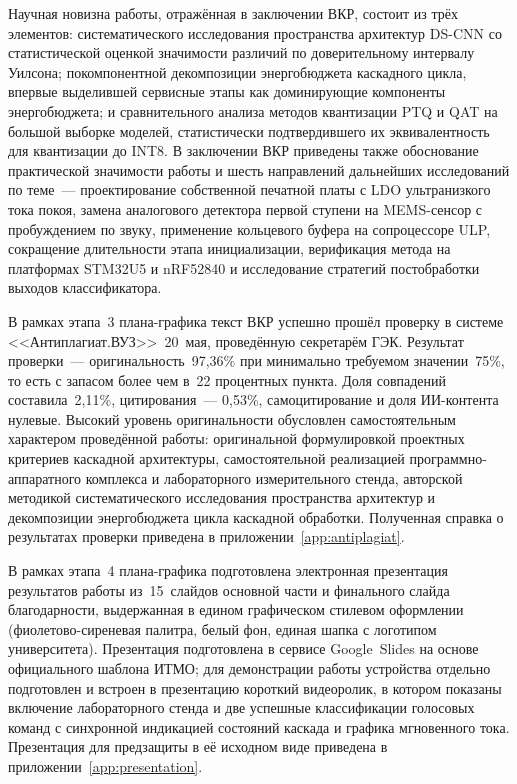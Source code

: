 Научная новизна работы, отражённая в заключении ВКР, состоит из
трёх элементов: систематического исследования пространства
архитектур DS-CNN со статистической оценкой значимости различий
по доверительному интервалу Уилсона; покомпонентной декомпозиции
энергобюджета каскадного цикла, впервые выделившей сервисные
этапы как доминирующие компоненты энергобюджета; и сравнительного
анализа методов квантизации PTQ и QAT на большой выборке моделей,
статистически подтвердившего их эквивалентность для квантизации
до INT8. В заключении ВКР приведены также обоснование практической
значимости работы и шесть направлений дальнейших исследований по
теме~--- проектирование собственной печатной платы с LDO
ультранизкого тока покоя, замена аналогового детектора первой
ступени на MEMS-сенсор с пробуждением по звуку, применение
кольцевого буфера на сопроцессоре ULP, сокращение длительности
этапа инициализации, верификация метода на платформах STM32U5 и
nRF52840 и исследование стратегий постобработки выходов
классификатора.

В рамках этапа~3 плана-графика текст ВКР успешно прошёл проверку
в системе <<Антиплагиат.ВУЗ>>~20~мая, проведённую секретарём ГЭК.
Результат проверки~--- оригинальность~97,36\% при минимально
требуемом значении~75\%, то есть с запасом более чем в~22
процентных пункта. Доля совпадений составила~2,11\%,
цитирования~--- 0,53\%, самоцитирование и доля ИИ-контента
нулевые. Высокий уровень оригинальности обусловлен
самостоятельным характером проведённой работы: оригинальной
формулировкой проектных критериев каскадной архитектуры,
самостоятельной реализацией программно-аппаратного комплекса и
лабораторного измерительного стенда, авторской методикой
систематического исследования пространства архитектур и
декомпозиции энергобюджета цикла каскадной обработки. Полученная
справка о результатах проверки приведена в
приложении~\ref{app:antiplagiat}.

В рамках этапа~4 плана-графика подготовлена электронная
презентация результатов работы из~15~слайдов основной части и
финального слайда благодарности, выдержанная в едином графическом
стилевом оформлении (фиолетово-сиреневая палитра, белый фон,
единая шапка с логотипом университета). Презентация подготовлена в
сервисе Google~Slides на основе официального шаблона ИТМО; для
демонстрации работы устройства отдельно подготовлен и встроен в
презентацию короткий видеоролик, в котором показаны включение
лабораторного стенда и две успешные классификации голосовых
команд с синхронной индикацией состояний каскада и графика
мгновенного тока. Презентация для предзащиты в её исходном виде
приведена в приложении~\ref{app:presentation}.

